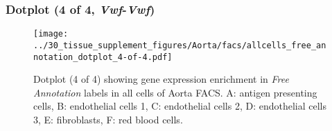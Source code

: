 \clearpage

\subsubsection{Dotplot (4 of 4, \emph{Vwf}-\emph{Vwf})}
\begin{figure}[h]
\centering
\texttt{[image: ../30\_tissue\_supplement\_figures/Aorta/facs/allcells\_free\_annotation\_dotplot\_4-of-4.pdf]}

\caption{ Dotplot (4 of 4)  showing gene expression enrichment in \emph{Free Annotation} labels in all cells of Aorta FACS. A: antigen presenting cells, B: endothelial cells 1, C: endothelial cells 2, D: endothelial cells 3, E: fibroblasts, F: red blood cells.}
\end{figure}

